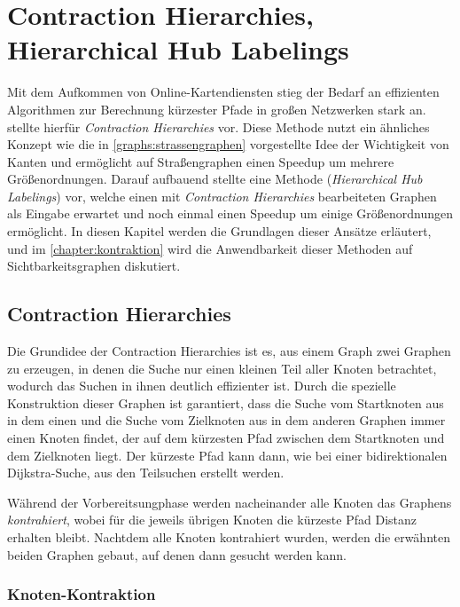 \chapter{Contraction Hierarchies, Hierarchical Hub Labelings}\label{chapter:ch}

Mit dem Aufkommen von Online-Kartendiensten stieg der Bedarf an effizienten Algorithmen zur Berechnung kürzester Pfade in großen Netzwerken stark an.
\cite{geisberger2008contraction} stellte hierfür \emph{Contraction Hierarchies} vor.
Diese Methode nutzt ein ähnliches Konzept wie die in \autoref{graphs:strassengraphen} vorgestellte Idee der Wichtigkeit von Kanten und ermöglicht auf Straßengraphen einen Speedup um mehrere Größenordnungen.
Darauf aufbauend stellte \cite{abraham2011hub} eine Methode (\emph{Hierarchical Hub Labelings}) vor, welche einen mit \emph{Contraction Hierarchies} bearbeiteten Graphen als Eingabe erwartet und noch einmal einen Speedup um einige Größenordnungen ermöglicht.
In diesen Kapitel werden die Grundlagen dieser Ansätze erläutert, und im \autoref{chapter:kontraktion} wird die Anwendbarkeit dieser Methoden auf Sichtbarkeitsgraphen diskutiert.

\section{Contraction Hierarchies}

Die Grundidee der Contraction Hierarchies ist es, aus einem Graph zwei Graphen zu erzeugen, in denen die Suche nur einen kleinen Teil aller Knoten betrachtet, wodurch das Suchen in ihnen deutlich effizienter ist.
Durch die spezielle Konstruktion dieser Graphen ist garantiert, dass die Suche vom Startknoten aus in dem einen und die Suche vom Zielknoten aus in dem anderen Graphen immer einen Knoten findet, der auf dem kürzesten Pfad zwischen dem Startknoten und dem Zielknoten liegt.
Der kürzeste Pfad kann dann, wie bei einer bidirektionalen Dijkstra-Suche, aus den Teilsuchen erstellt werden.

Während der Vorbereitsungphase werden nacheinander alle Knoten das Graphens \emph{kontrahiert}, wobei für die jeweils übrigen Knoten die kürzeste Pfad Distanz erhalten bleibt.
Nachtdem alle Knoten kontrahiert wurden, werden die erwähnten beiden Graphen gebaut, auf denen dann gesucht werden kann.

\subsection{Knoten-Kontraktion}


